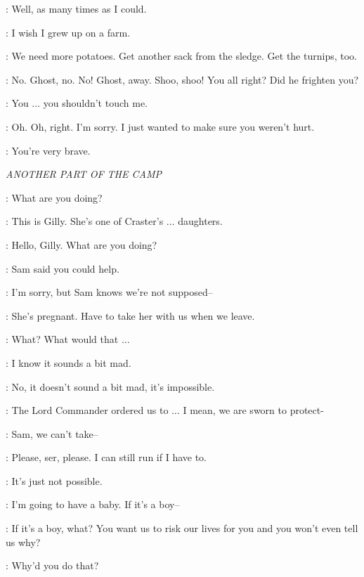 \GRENN: Well, as many times as I could.

\SAM: I wish I grew up on a farm.

\EDD: We need more potatoes. Get another sack from the sledge. Get the turnips, too.



\SAM: No. Ghost, no. No! Ghost, away. Shoo, shoo! You all right? Did he frighten you?

\GILLY: You $\ldots$ you shouldn't touch me.

\SAM: Oh. Oh, right. I'm sorry. I just wanted to make sure you weren't hurt.

\GILLY: You're very brave.


\scene

\textit{ANOTHER PART OF THE CAMP}


\JON: What are you doing?

\SAM: This is Gilly. She's one of Craster's $\ldots$ daughters.

\JON: Hello, Gilly. What are you doing?

\GILLY: Sam said you could help.

\JON: I'm sorry, but Sam knows we're not supposed--

\SAM: She's pregnant. Have to take her with us when we leave.

\JON: What? What would that $\ldots$

\SAM: I know it sounds a bit mad.

\JON: No, it doesn't sound a bit mad, it's impossible.

\SAM: The Lord Commander ordered us to $\ldots$ I mean, we are sworn to protect-

\JON: Sam, we can't take--

\GILLY: Please, ser, please. I can still run if I have to.

\JON: It's just not possible.

\GILLY: I'm going to have a baby. If it's a boy--

\JON: If it's a boy, what? You want us to risk our lives for you and you won't even tell us why?


\SAM: Why'd you do that?

